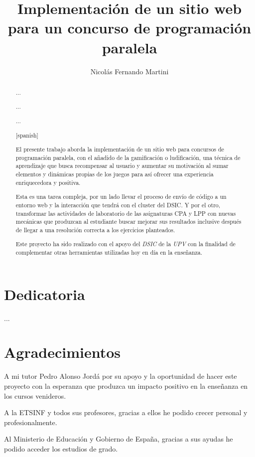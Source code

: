 \documentclass[11pt,spanish,listoffigures,listoftables]{tfgetsinf}
\title{Implementación de un sitio web para un concurso de programación paralela}
\author{Nicolás Fernando Martini}
\newenvironment{dedication}
{%
	\thispagestyle{empty}%
	\itshape             %
}
{\par %
	\vspace{\stretch{3}} %
	\clearpage           %
}
\begin{document}
	

\begin{dedication}	
	
	\chapter*{Dedicatoria}
	
	...

	\chapter*{Agradecimientos}
		A mi tutor Pedro Alonso Jordá por su apoyo y la oportunidad de hacer este proyecto con la esperanza que produzca un impacto positivo en la enseñanza en los cursos venideros. \par
		A la ETSINF y todos sus profesores, gracias a ellos he podido crecer personal y profesionalmente. \par
		Al Ministerio de Educación y Gobierno de España, gracias a sus ayudas he podido acceder los estudios de grado.
		
\end{dedication}

\begin{abstract}

... \par

... \par

... \par

\end{abstract}

\begin{abstract}[spanish]
	
El presente trabajo aborda la implementación de un sitio web para concursos de programación paralela, con el añadido de la gamificación o ludificación, una técnica de aprendizaje que busca recompensar al usuario y aumentar su motivación al sumar elementos y dinámicas propias de los juegos para así ofrecer una experiencia enriquecedora y positiva. \par 

Esta es una tarea compleja, por un lado llevar el proceso de envío de código a un entorno web y la interacción que tendrá con el cluster \kahan del DSIC. Y por el otro, transformar las actividades de laboratorio de las asignaturas CPA y LPP con nuevas mecánicas que produzcan al estudiante buscar mejorar sus resultados inclusive después de llegar a una resolución correcta a los ejercicios planteados. \par

Este proyecto ha sido realizado con el apoyo del \textit{DSIC} de la \textit{UPV} con la finalidad de complementar otras herramientas utilizadas hoy en día en la enseñanza. \par


\end{abstract}
\end{document}
